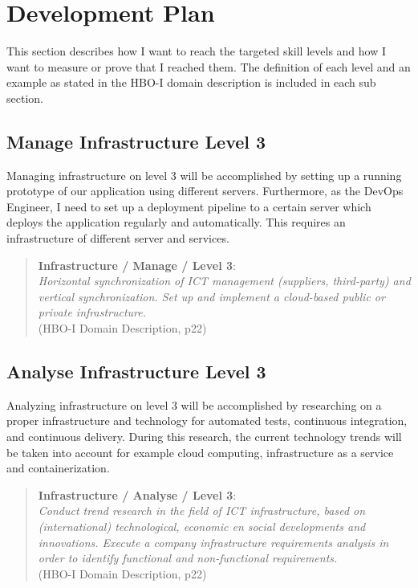 
\section{Development Plan}
\label{sec:development}

This section describes how I want to reach the targeted skill levels and how I want to measure or prove that I reached them.
The definition of each level and an example as stated in the HBO-I domain description is included in each sub section.


\subsection{Manage Infrastructure Level 3}

Managing infrastructure on level 3 will be accomplished by setting up a running prototype of our application using different servers.
Furthermore, as the DevOps Engineer, I need to set up a deployment pipeline to a certain server which deploys the application regularly and automatically. This requires an infrastructure of different server and services.

\begin{quote}
	\textbf{Infrastructure / Manage / Level 3}: \\
	\textit{
		Horizontal synchronization of ICT management (suppliers, third-party) and vertical synchronization.
		Set up and implement a cloud-based public or private infrastructure.
	} \\ (HBO-I Domain Description, p22)
\end{quote}


\subsection{Analyse Infrastructure Level 3}
\label{analyzeinfra3}

Analyzing infrastructure on level 3 will be accomplished by researching on a proper infrastructure and technology for automated tests, continuous integration, and continuous delivery. During this research, the current technology trends will be taken into account for example cloud computing, infrastructure as a service and containerization.

\begin{quote}
	\textbf{Infrastructure / Analyse / Level 3}: \\
	\textit{
		Conduct trend research in the field of ICT infrastructure, based on (international) technological, economic en social developments and innovations. 
		Execute a company infrastructure requirements analysis in order to identify functional and non-functional requirements.
	} \\ (HBO-I Domain Description, p22)
\end{quote}


